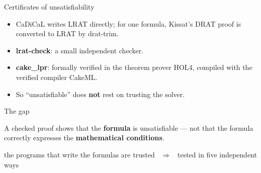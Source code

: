 \begin{frame}{Certificates of unsatisfiability}
\begin{center}
\end{center}
\vspace{1ex}
\begin{itemize}
\item CaDiCaL writes LRAT directly; for one formula, Kissat's DRAT proof is converted to LRAT by \textsf{drat-trim}.
\item \textbf{lrat-check}: a small independent checker.
\item \textbf{cake\_lpr}: formally verified in the theorem prover HOL4, compiled with the verified compiler CakeML.
\item So ``unsatisfiable'' does \textbf{not} rest on trusting the solver.
\end{itemize}
\end{frame}

\begin{frame}{The gap}
\vspace{4ex}
\begin{plainbox}\large
A checked proof shows that the \textbf{formula} is unsatisfiable --- not that the formula correctly expresses the \textbf{mathematical conditions}.
\end{plainbox}
\vspace{2ex}
\begin{center}the programs that write the formulas are trusted \ $\Rightarrow$ \ tested in five independent ways\end{center}
\end{frame}

